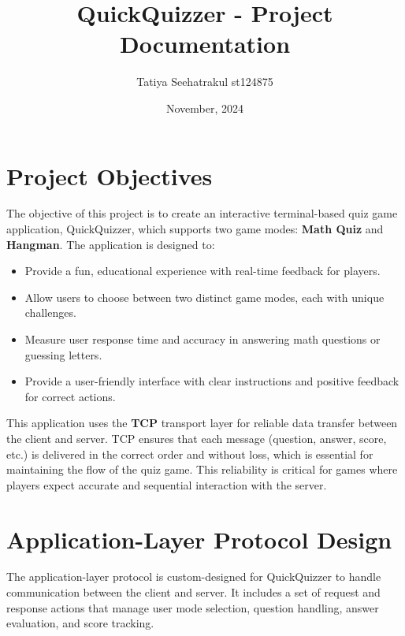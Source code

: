 \documentclass[12pt]{article}
\title{QuickQuizzer - Project Documentation}
\author{Tatiya Seehatrakul st124875}
\date{November, 2024}
\begin{document}
\maketitle

\section{Project Objectives}
The objective of this project is to create an interactive terminal-based quiz game application, QuickQuizzer, which supports two game modes: \textbf{Math Quiz} and \textbf{Hangman}. The application is designed to:
\begin{itemize}
    \item Provide a fun, educational experience with real-time feedback for players.
    \item Allow users to choose between two distinct game modes, each with unique challenges.
    \item Measure user response time and accuracy in answering math questions or guessing letters.
    \item Provide a user-friendly interface with clear instructions and positive feedback for correct actions.
\end{itemize}

This application uses the \textbf{TCP} transport layer for reliable data transfer between the client and server. TCP ensures that each message (question, answer, score, etc.) is delivered in the correct order and without loss, which is essential for maintaining the flow of the quiz game. This reliability is critical for games where players expect accurate and sequential interaction with the server.

\newpage
\section{Application-Layer Protocol Design}
The application-layer protocol is custom-designed for QuickQuizzer to handle communication between the client and server. It includes a set of request and response actions that manage user mode selection, question handling, answer evaluation, and score tracking. 
\end{document}
